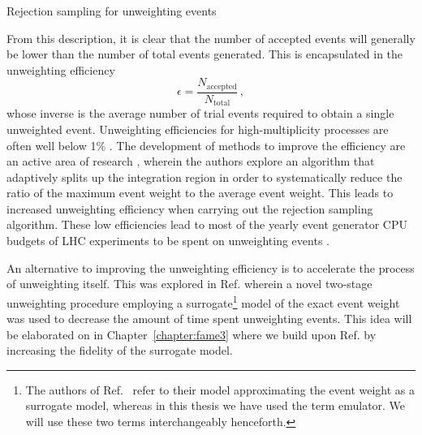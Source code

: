 \documentclass[main.tex]{subfiles}
\begin{document}
    \begin{algorithm}[ht]
        \caption{Rejection sampling for unweighting events}\label{alg:unweighting}
    \end{algorithm}

    From this description, it is clear that the number
    of accepted events will generally be lower than
    the number of total events generated. This is encapsulated
    in the unweighting efficiency
    \begin{equation}\label{eqn:unweighting_efficiency}
        \epsilon = \dfrac{N_{\mathrm{accepted}}}{N_{\mathrm{total}}} \, ,
    \end{equation}
    whose inverse is the average number of trial
    events required to obtain a single unweighted event.
    Unweighting efficiencies for high-multiplicity processes
    are often well below 1\% \cite{Hoche:2019flt,Gao:2020zvv}.
    The development of methods to improve the efficiency are an active
    area of research \cite{Jadach:1999sf,Jadach:2002kn}, wherein the
    authors explore an algorithm that adaptively splits up the integration
    region in order to systematically reduce the ratio of
    the maximum event weight to the average event weight. This leads to
    increased unweighting efficiency when carrying out the rejection sampling
    algorithm.
    These low efficiencies lead to most of the
    yearly event generator CPU budgets of LHC experiments to be spent on
    unweighting events \cite{HSFPhysicsEventGeneratorWG:2020gxw}.

    An alternative to improving the unweighting efficiency
    is to accelerate the process of unweighting itself. This
    was explored in Ref. \cite{Danziger:2021eeg} wherein a
    novel two-stage unweighting procedure employing a surrogate\footnote{The authors of Ref.~\cite{Danziger:2021eeg}
    refer to their model approximating the event weight as a surrogate model, whereas in
    this thesis we have used the term emulator. We will use these two terms interchangeably
    henceforth.}
    model of the exact event weight was used to decrease the amount of
    time spent unweighting events. This idea will be elaborated on
    in Chapter~\ref{chapter:fame3} where we build upon
    Ref. \cite{Danziger:2021eeg} by increasing the fidelity of
    the surrogate model.
\end{document}
